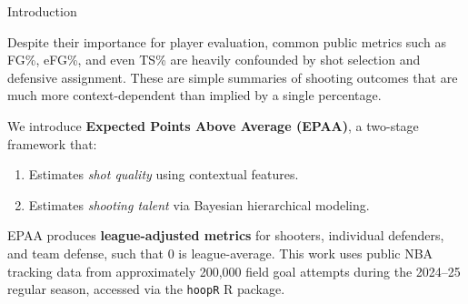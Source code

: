 \documentclass[final]{beamer}
\newlength{\onecolwid}
\begin{document}
\begin{frame}[t]
\begin{columns}[t]
\begin{column}{\onecolwid}
\begin{alertblock}{Introduction}
\vspace{2ex}



Despite their importance for player evaluation, common public metrics such as FG\%, eFG\%, and even TS\% are heavily confounded by shot selection and defensive assignment. These are simple summaries of shooting outcomes that are much more context-dependent than implied by a single percentage.

\vspace{2ex}

We introduce \textbf{Expected Points Above Average (EPAA)}, a two-stage framework that:

\begin{enumerate}
\item Estimates \textit{shot quality} using contextual features.
\item Estimates \textit{shooting talent} via Bayesian hierarchical modeling.
\end{enumerate}

\vspace{2ex}

EPAA produces \textbf{league-adjusted metrics} for shooters, individual defenders, and team defense, such that 0 is league-average. This work uses public NBA tracking data from approximately 200,000 field goal attempts during the 2024–25 regular season, accessed via the \texttt{hoopR} R package.

\end{alertblock}



\end{column}
\end{columns}
\end{frame}
\end{document}
